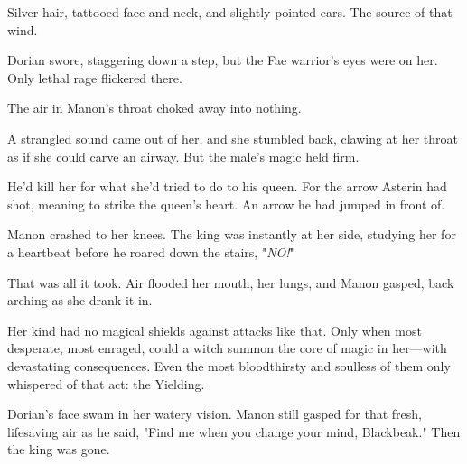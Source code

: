 Silver hair, tattooed face and neck, and slightly pointed ears. The source of that wind.

Dorian swore, staggering down a step, but the Fae warrior's eyes were on her. Only lethal rage flickered there.

The air in Manon's throat choked away into nothing.

A strangled sound came out of her, and she stumbled back, clawing at her throat as if she could carve an airway. But the male's magic held firm.

He'd kill her for what she'd tried to do to his queen. For the arrow Asterin had shot, meaning to strike the queen's heart. An arrow he had jumped in front of.

Manon crashed to her knees. The king was instantly at her side, studying her for a heartbeat before he roared down the stairs, "\emph{NO!}"

That was all it took. Air flooded her mouth, her lungs, and Manon gasped, back arching as she drank it in.

Her kind had no magical shields against attacks like that. Only when most desperate, most enraged, could a witch summon the core of magic in her---with devastating consequences. Even the most bloodthirsty and soulless of them only whispered of that act: the Yielding.

Dorian's face swam in her watery vision. Manon still gasped for that fresh, lifesaving air as he said, "Find me when you change your mind, Blackbeak." Then the king was gone.
